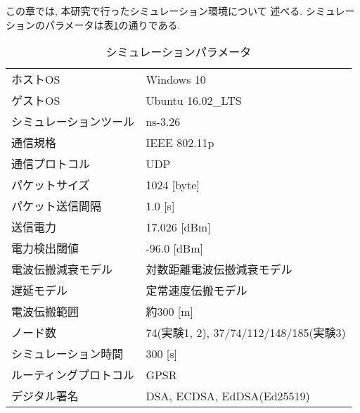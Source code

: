 この章では, 本研究で行ったシミュレーション環境について
述べる. シミュレーションのパラメータは表\ref{tab:simulation_parameter}の通りである.
\setlength{\tabcolsep}{30pt}
\begin{longtable}{ll}
  \caption{シミュレーションパラメータ}
  \label{tab:simulation_parameter}
  \endfirsthead
  \hline
  ホストOS & Windows 10\\
  ゲストOS & Ubuntu 16.02\_LTS\\
  シミュレーションツール & ns-3.26 \\
  通信規格 & IEEE 802.11p \\
  通信プロトコル & UDP \\
  パケットサイズ & 1024 [byte] \\
  パケット送信間隔 & 1.0 [s] \\
  送信電力 & 17.026 [dBm] \\
  電力検出閾値 & -96.0 [dBm] \\
  電波伝搬減衰モデル & 対数距離電波伝搬減衰モデル \\
  遅延モデル & 定常速度伝搬モデル \\
  電波伝搬範囲 & 約300 [m] \\
  ノード数 & 74(実験1, 2), 37/74/112/148/185(実験3) \\
  シミュレーション時間 & 300 [s] \\
  ルーティングプロトコル & GPSR \\
  デジタル署名 & DSA, ECDSA, EdDSA(Ed25519) \\ \hline
\end{longtable}
\vspace{3em}


\vspace{2em}

\vspace{2em}

\vspace{1em}

\vspace{2em}

\vspace{2em}

